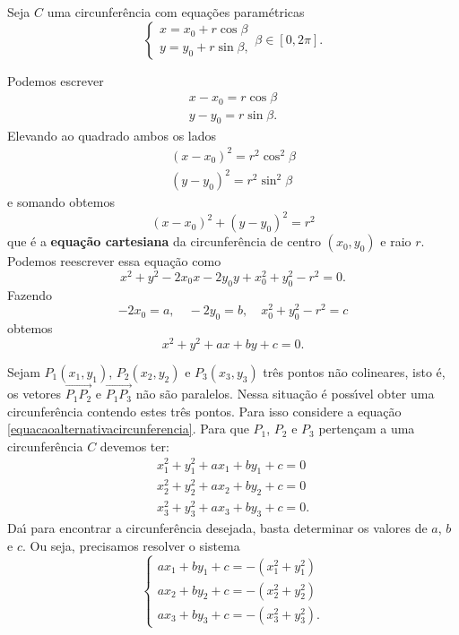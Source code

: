Seja $C$ uma circunfer\^encia com equa\c{c}\~oes param\'etricas
\[
    \begin{cases}
      x = x_0 + r\cos\beta\\
      y = y_0 + r\sin\beta,
    \end{cases}
    \beta \in [0,2\pi].
\]

Podemos escrever
\begin{align*}
  x - x_0 = r\cos\beta\\
  y - y_0 = r\sin\beta.
\end{align*}
Elevando ao quadrado ambos os lados
\begin{align*}
  (x - x_0)^2 = r^2\cos^2\beta\\
  (y - y_0)^2 = r^2\sin^2\beta
\end{align*}
e somando obtemos
\begin{equation}
  (x - x_0)^2 + (y - y_0)^2 = r^2
\end{equation}
que \'e a \textbf{equa\c{c}\~ao cartesiana} da circunfer\^encia de centro $(x_0,y_0)$ e raio $r$.
Podemos reescrever essa equa\c{c}\~ao como
\[
  x^2 + y^2 - 2x_0x - 2y_0y + x_0^2 + y_0^2 - r^2 = 0.
\]
Fazendo
\[
  -2x_0 = a,\quad -2y_0 = b,\quad x_0^2 + y_0^2 - r^2 = c
\]
obtemos
\begin{equation}\label{equacaoalternativacircunferencia}
  x^2 + y^2 + ax + by + c = 0.
\end{equation}

Sejam $P_1(x_1,y_1)$, $P_2(x_2,y_2)$ e $P_3(x_3,y_3)$ tr\^es pontos n\~ao colineares, isto \'e, os vetores $\vec{P_1P_2}$ e $\vec{P_1P_3}$ n\~ao s\~ao paralelos. Nessa situa\c{c}\~ao \'e poss{\'\i}vel obter uma circunfer\^encia contendo estes tr\^es pontos. Para isso considere a equa\c{c}\~ao \eqref{equacaoalternativacircunferencia}. Para que $P_1$, $P_2$ e $P_3$ perten\c{c}am a uma circunfer\^encia $C$ devemos ter:
\begin{align*}
  x_1^2 + y_1^2 + ax_1 + by_1 + c = 0\\
  x_2^2 + y_2^2 + ax_2 + by_2 + c = 0\\
  x_3^2 + y_3^2 + ax_3 + by_3 + c = 0.
\end{align*}
Da{\'\i} para encontrar a circunfer\^encia desejada, basta determinar os valores de $a$, $b$ e $c$. Ou seja, precisamos resolver o sistema
\[
  \begin{cases}
    ax_1 + by_1 + c = -(x_1^2 + y_1^2)\\
    ax_2 + by_2 + c = -(x_2^2 + y_2^2)\\
    ax_3 + by_3 + c = -(x_3^2 + y_3^2).
  \end{cases}
\]

